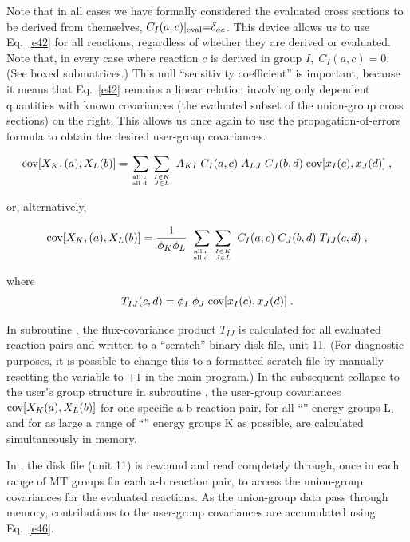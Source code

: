 \noindent
Note that in all cases we have formally considered the evaluated cross
sections to be derived from themselves, $C_I(a,c)|_{\rm eval}{=}
\delta_{ac}$.  This device allows us to use Eq.~\ref{e42} for all
reactions, regardless of whether they are derived or
evaluated.  Note that, in every case where reaction $c$ is
derived in group $I,\; C_I(a,c) {=} 0$.  (See boxed submatrices.)
This null ``sensitivity coefficient'' is important, because it means
that Eq.~\ref{e42} remains a linear relation involving only dependent
quantities with known covariances (the evaluated subset
of the union-group cross sections) on the right.  This allows us once
again to use the propagation-of-errors formula to obtain the desired
user-group covariances.

\begin{equation}
{\rm cov} [X_K,(a),X_L(b)] = \sum_{{\rm all \; c\;} \atop{\rm all \;d\;}}
 \sum_{I\in K\atop {J \in L}} \; A_{KI} \; C_I (a,c) \; A_{LJ} \;
   C_J (b,d) \; {\rm {\rm cov}} [x_I(c),x_J(d)]\; ,
\label{e46}
\end{equation}

\noindent
or, alternatively,

\begin{equation}
{\rm {\rm cov}} [X_K,(a),X_L(b)] = \frac{1}{\phi_K \phi_L}\;
  \sum_{{\rm all \; c\;} \atop{\rm all \;d\;}}
 \sum_{I\in K\atop {J \in L}} \; C_I(a,c)\; C_J(b,d) \; T_{IJ}(c,d)\; ,
\end{equation}

\noindent
where
\begin{equation}
T_{IJ}(c,d) = \phi_I\; \phi_J \; {\rm {\rm cov}} [x_I(c),x_J(d) ] \; .
\end{equation}

In subroutine , the
flux-covariance product $T_{IJ}$ is calculated for all evaluated
reaction pairs and written to a ``scratch'' binary disk file, unit 11.
 (For diagnostic purposes, it is possible to change this to a
formatted scratch file by manually resetting the variable
 to  $+1$ in the main program.)  In
the subsequent collapse to the user's group structure in
subroutine , the user-group covariances ${\rm {\rm
cov}}[X_K(a),X_L(b)]$ for one specific a-b reaction pair, for all
``'' energy groups L, and for as large a range of ``''
energy groups K as possible, are calculated simultaneously in memory.

In , the disk file (unit 11)
is rewound and read completely through, once in each range of MT groups
for each a-b reaction pair, to access the union-group covariances for
the evaluated reactions.  As the union-group data pass through memory,
contributions to the user-group covariances are accumulated using
Eq.~\ref{e46}.

